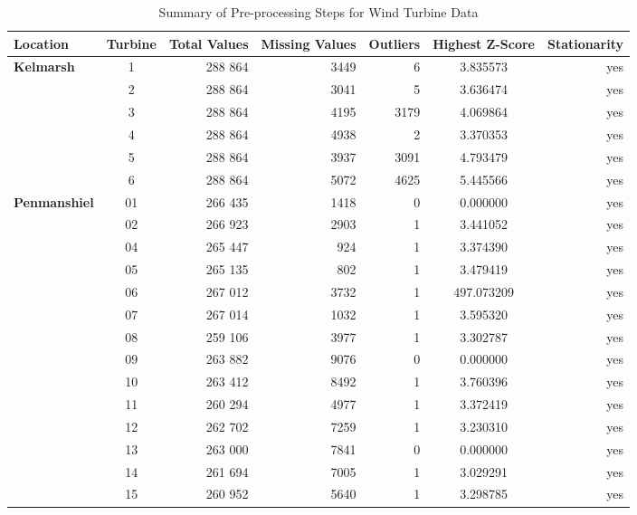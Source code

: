 \documentclass{article}
\begin{document}
\begin{table}[!ht]
\small
\centering
    \begin{tabular}{l|c|r|r|r|S|r}
    \toprule
    \textbf{Location} & \textbf{Turbine} & \textbf{Total Values} & \textbf{Missing Values} & \textbf{Outliers} & \textbf{Highest Z-Score} & \textbf{Stationarity} \\
    \midrule
\textbf{Kelmarsh} & 1 & 288 864 & 3449 & 6 & 3.835573 & yes \\
         & 2 & 288 864 & 3041 & 5 & 3.636474 & yes \\
         & 3 & 288 864 & 4195 & 3179 & 4.069864 & yes \\
         & 4 & 288 864 & 4938 & 2 & 3.370353 & yes \\
         & 5 & 288 864 & 3937 & 3091 & 4.793479 & yes \\
         & 6 & 288 864 & 5072 & 4625 & 5.445566 & yes \\
    \midrule
\textbf{Penmanshiel} & 01 & 266 435 & 1418 & 0 & 0.000000 & yes \\
            & 02 & 266 923 & 2903 & 1 & 3.441052 & yes \\
            & 04 & 265 447 & 924 & 1 & 3.374390 & yes \\
            & 05 & 265 135 & 802 & 1 & 3.479419 & yes \\
            & 06 & 267 012 & 3732 & 1 & 497.073209 & yes \\
            & 07 & 267 014 & 1032 & 1 & 3.595320 & yes \\
            & 08 & 259 106 & 3977 & 1 & 3.302787 & yes \\
            & 09 & 263 882 & 9076 & 0 & 0.000000 & yes \\
            & 10 & 263 412 & 8492 & 1 & 3.760396 & yes \\
            & 11 & 260 294 & 4977 & 1 & 3.372419 & yes \\
            & 12 & 262 702 & 7259 & 1 & 3.230310 & yes \\
            & 13 & 263 000 & 7841 & 0 & 0.000000 & yes \\
            & 14 & 261 694 & 7005 & 1 & 3.029291 & yes \\
            & 15 & 260 952 & 5640 & 1 & 3.298785 & yes \\
    \bottomrule
    \end{tabular}
\caption{Summary of Pre-processing Steps for Wind Turbine Data}
\label{tab:preprocessing_windturbines}
\end{table}
\end{document}
